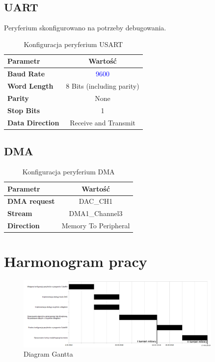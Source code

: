 \documentclass[10pt, a4paper]{article}
\begin{document}
\subsection{UART}
Peryferium skonfigurowano na potrzeby debugowania.
\begin{table}[H]
	\centering
	\begin{tabular}{|l|c|} \hline
		\textbf{Parametr} & Wartość \\
		\hline
		\hline  \textbf{Baud Rate}&\textcolor{blue}{9600}\\\hline
		\textbf{Word Length } & 8 Bits (including parity)\\\hline
		\textbf{Parity} &  None\\
		\hline
		\textbf{Stop Bits}& 1\\
		\hline
		\textbf{Data Direction}& Receive and Transmit\\
		\hline
	\end{tabular}
	\caption{Konfiguracja peryferium USART}
	\label{tab:USART}
\end{table}

\subsection{DMA}
\begin{table}[H]
	\centering
	\begin{tabular}{|l|c|} \hline
		\textbf{Parametr} & Wartość \\
		\hline
		\hline  \textbf{DMA request}& DAC\_CH1\\\hline
		\textbf{Stream} & DMA1\_Channel3\\
		\hline
		\textbf{Direction} & Memory To Peripheral\\
		\hline
	\end{tabular}
	\caption{Konfiguracja peryferium DMA}
	\label{tab:DAC}
\end{table}

\section{Harmonogram pracy}

\begin{figure}[H]
	\centering
	\includegraphics[width=0.9\textwidth]{gantt_diagram.png}
	\caption{Diagram Gantta}
	\label{fig:DiagramGantta}
\end{figure}
\end{document}
